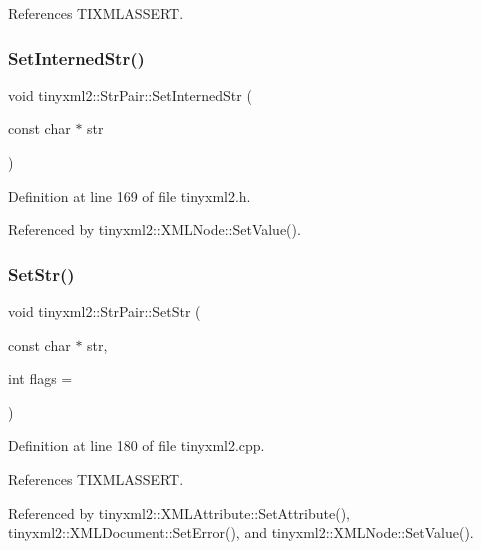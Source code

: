 References T\+I\+X\+M\+L\+A\+S\+S\+E\+RT.

\mbox{\label{classtinyxml2_1_1_str_pair_a2baf6230e18333e02ab65d0897ee3941}} 
\subsubsection{Set\+Interned\+Str()}
{\footnotesize\ttfamily void tinyxml2\+::\+Str\+Pair\+::\+Set\+Interned\+Str (\begin{DoxyParamCaption}\item[{const char $\ast$}]{str }\end{DoxyParamCaption})\hspace{0.3cm}{\ttfamily [inline]}}



Definition at line 169 of file tinyxml2.\+h.



Referenced by tinyxml2\+::\+X\+M\+L\+Node\+::\+Set\+Value().

\mbox{\label{classtinyxml2_1_1_str_pair_a1f82ec6b5bee35ee7466d8565e43b1de}} 
\subsubsection{Set\+Str()}
{\footnotesize\ttfamily void tinyxml2\+::\+Str\+Pair\+::\+Set\+Str (\begin{DoxyParamCaption}\item[{const char $\ast$}]{str,  }\item[{int}]{flags = {} }\end{DoxyParamCaption})}



Definition at line 180 of file tinyxml2.\+cpp.



References T\+I\+X\+M\+L\+A\+S\+S\+E\+RT.



Referenced by tinyxml2\+::\+X\+M\+L\+Attribute\+::\+Set\+Attribute(), tinyxml2\+::\+X\+M\+L\+Document\+::\+Set\+Error(), and tinyxml2\+::\+X\+M\+L\+Node\+::\+Set\+Value().

\mbox{\label{classtinyxml2_1_1_str_pair_a35f795b1557fe5fdcbd93d3cc5d6b939}} 
